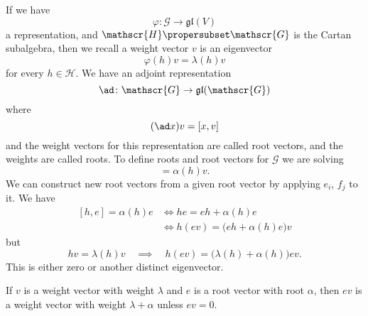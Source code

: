 If we have
\begin{equation}
\varphi\colon\mathscr{G}\to\mathfrak{gl}(V)
\end{equation}
a representation, and $\mathscr{H}\propersubset\mathscr{G}$ is
the Cartan subalgebra, then we recall a weight vector $v$ is an
eigenvector
\begin{equation}
\varphi(h)v = \lambda(h)v
\end{equation}
for every $h\in\mathscr{H}$. We have an adjoint representation
\begin{equation}
\ad\colon\mathscr{G}\to\mathfrak{gl}(\mathscr{G})
\end{equation}
where
\begin{equation}
(\ad x)v = [x,v]
\end{equation}
and the weight vectors for this representation are called root
vectors, and the weights are called roots. To define roots and
root vectors for $\mathscr{G}$ we are solving
\begin{equation}
[h,v] = \alpha(h)v.
\end{equation}
We can construct new root vectors from a given root vector by
applying $e_{i}$, $f_{j}$ to it. We have
\begin{subequations}
\begin{align}
[h,e] = \alpha(h)e & \iff he=eh+\alpha(h)e \\
 & \iff h(ev) = \big(eh+\alpha(h)e\big)v
\end{align}
\end{subequations}
but 
\begin{equation}
hv = \lambda(h)v \quad\implies\quad h(ev) =
\big(\lambda(h)+\alpha(h)\big) ev.
\end{equation}
This is either zero or another distinct eigenvector.

\begin{prop}
If $v$ is a weight vector with weight $\lambda$ and $e$ is a root
vector with root $\alpha$, then $ev$ is a weight vector with
weight $\lambda+\alpha$ unless $ev=0$.
\end{prop}

